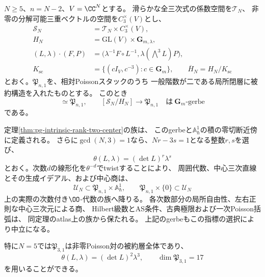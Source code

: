 \begin{corollary}[階数二の被約Poisson層全体への次数付き代数の降下]
\label{cor:pg-intrinsic-rank-two-descent}
$N\ge5$、$n=N-2$、$V=\CC^N$とする。
滑らかな全三次式の係数空間を$\mathcal T_N$、
非零の分解可能三重ベクトルの空間を$C_3^\times(V)$とし、
\begin{equation}
 \begin{aligned}
 \mathcal S_N&=\mathcal T_N\times C_3^\times(V),\\
 H_N&=\mathrm{GL}(V)\times\mathbf G_{m,\lambda},\\
 (L,\lambda)\cdot(F,P)
   &=\bigl(\lambda^{-1}F\circ L^{-1},
            \lambda(\bigwedge^3L)P\bigr),\\
 K_{\mathrm{sc}}&=\{(cI_V,c^{-3}):c\in\mathbf G_m\},
 \qquad \overline H_N=H_N/K_{\mathrm{sc}}
 \end{aligned}
 \label{eq:pg-intrinsic-descent-base}
\end{equation}
とおく。$\mathfrak P_{n,1}$を、相対Poissonスタックのうち
一般階数が二である局所閉層に被約構造を入れたものとする。
このとき
\begin{equation}
 [\mathcal S_N/\overline H_N]\simeq\mathfrak P_{n,1},
 \qquad
 [\mathcal S_N/H_N]\longrightarrow\mathfrak P_{n,1}
 \quad\text{は}\ \mathbf G_m\text{-gerbe}
 \label{eq:pg-intrinsic-descent-gerbe}
\end{equation}
である。

定理\ref{thm:pg-intrinsic-rank-two-center}の族は、
このgerbeと$\mathbb A^1_\hbar$の積の零切断近傍に定義される。
さらに$\gcd(N,3)=1$なら、$Nr-3s=1$となる整数$r,s$を選び、
\begin{equation}
 \theta(L,\lambda)=(\det L)^r\lambda^s
 \label{eq:pg-intrinsic-descent-character}
\end{equation}
とおく。次数$d$の線形化を$\theta^{-d}$でtwistすることにより、
周囲代数、中心三次直線とその生成イデアル、および中心商は、
\begin{equation}
 \mathcal U_N\subset\mathfrak P_{n,1}\times\mathbb A^1_\hbar,
 \qquad
 \mathfrak P_{n,1}\times\{0\}\subset\mathcal U_N
 \label{eq:pg-intrinsic-descended-open}
\end{equation}
上の実際の次数付き$\OO$-代数の族へ降りる。
各次数部分の局所自由性、左右正則な中心三次元による商、
Hilbert級数とAS条件、古典極限および一次Poisson括弧は、
同定理のatlas上の族から保たれる。
上記のgerbeもこの指標の選択により中立になる。

特に$N=5$では$\mathfrak P_{3,1}$は非零Poisson対の被約層全体であり、
\begin{equation}
 \theta(L,\lambda)=(\det L)^2\lambda^3,
 \qquad \dim\mathfrak P_{3,1}=17
 \label{eq:pg-intrinsic-threefold-descent}
\end{equation}
を用いることができる。
\end{corollary}
